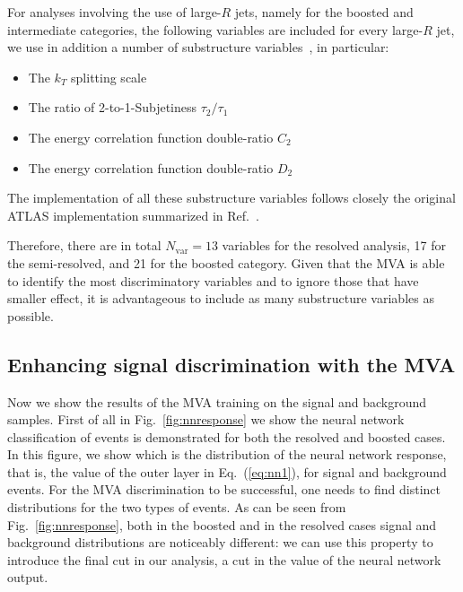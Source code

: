 For analyses involving the use of large-$R$ jets,
namely for the boosted and intermediate categories,
the following variables are included for
every large-$R$ jet,
we use in addition a number of substructure variables~\cite{Aad:2013gja},
in particular:
\begin{itemize}
\item The $k_T$ splitting scale~\cite{Butterworth:2008iy}
\item The ratio of 2-to-1-Subjetiness $\tau_{2}/\tau_{1}$~\cite{Thaler:2010tr}
\item The energy correlation function double-ratio $C_2$~\cite{Larkoski:2013eya}
\item The energy correlation function double-ratio $D_2$~\cite{Larkoski:2013eya}
\end{itemize}
The implementation of all these substructure variables follows
closely the original ATLAS implementation summarized in Ref.~\cite{Aad:2013gja}.


Therefore, there are in total $N_{\mathrm{var}}=13$ variables for the resolved analysis, 17 for the semi-resolved, and 21 for the boosted category.
%
Given that the MVA is able to identify the most discriminatory variables
and to ignore those that have smaller effect, it is advantageous to
include as many substructure variables as possible.

\subsection{Enhancing signal discrimination with the MVA}

Now we show the results of the MVA training on the signal and
background samples.
%
First of all in Fig.~\ref{fig:nnresponse} we show
the neural network classification of events is demonstrated for both the resolved and boosted cases.
%
In this figure, we show which is the distribution of the neural network
response, that is, the value of the outer layer in Eq.~(\ref{eq:nn1}),
for signal and background events.
%
For the MVA discrimination to be successful, one needs to find
distinct distributions for the two types of events.
%
As can be seen from  Fig.~\ref{fig:nnresponse}, both
in the boosted and in the resolved cases signal and background
distributions are noticeably different: we can use this property
to introduce the final cut in our analysis, a cut in the value
of the neural network output.

